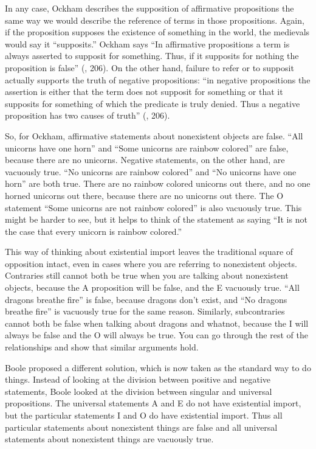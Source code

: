 In any case, Ockham describes the supposition of affirmative propositions the same way we would describe the reference of terms in those propositions. Again, if the proposition supposes the existence of something in the world, the medievals would say it ``supposits.''  Ockham says ``In affirmative propositions a term is always asserted to supposit for something. Thus, if it supposits for nothing the proposition is false'' (\citep{Ockham1343}, 206). On the other hand, failure to refer or to supposit actually supports the truth of negative propositions: ``in negative propositions the assertion is either that the term does not supposit for something or that it supposits for something of which the predicate is truly denied. Thus a negative proposition has two causes of truth'' (\citep{Ockham1343}, 206).

So, for Ockham, affirmative statements about nonexistent objects are false. ``All unicorns have one horn'' and ``Some unicorns are rainbow colored'' are false, because there are no unicorns. Negative statements, on the other hand, are vacuously true. ``No unicorns are rainbow colored'' and ``No unicorns have one horn'' are both true. There are no rainbow colored unicorns out there, and no one horned unicorns out there, because there are no unicorns out there. The O statement ``Some unicorns are not rainbow colored'' is also vacuously true. This might be harder to see, but it helps to think of the statement as saying ``It is not the case that every unicorn is rainbow colored.''

This way of thinking about existential import leaves the traditional square of opposition intact, even in cases where you are referring to nonexistent objects. Contraries still cannot both be true when you are talking about nonexistent objects, because the A proposition will be false, and the E vacuously true. ``All dragons breathe fire'' is false, because dragons don't exist, and ``No dragons breathe fire'' is vacuously true for the same reason. Similarly, subcontraries cannot both be false when talking about dragons and whatnot, because the I will always be false and the O will always be true. You can go through the rest of the relationships and show that similar arguments hold. \label{proving_trad_square}

Boole proposed a different solution, which is now taken as the standard way to do things. Instead of looking at the division between positive and negative statements, Boole looked at the division between singular and universal propositions. The universal statements A and E do not have existential import, but the particular statements I and O do have existential import. Thus all particular statements about nonexistent things are false and all universal statements about nonexistent things are vacuously true.

